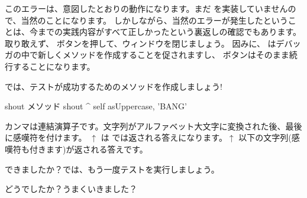\documentclass[a4paper,10pt,twoside]{book}
\begin{document}
このエラーは、意図したとおりの動作になります。まだ  を実装していませんので、当然のことになります。
しかしながら、当然のエラーが発生したということは、今までの実践内容がすべて正しかったという裏返しの確認でもあります。
取り敢えず、 ボタンを押して、ウィンドウを閉じましょう。
因みに、 はデバッガの中で新しくメソッドを作成することを促されますし、 ボタンはそのまま続行することになります。

では、テストが成功するためのメソッドを作成しましょう!

\begin{method}[shout]{shout メソッド}
shout
	^ self asUppercase, 'BANG'
\end{method}

カンマは連結演算子です。文字列がアルファベット大文字に変換された後、最後に感嘆符を付けます。
$\uparrow$ は \pharo では返される答えになります。$\uparrow$ 以下の文字列(感嘆符も付きます)が返される答えです。

できましたか？では、もう一度テストを実行しましょう。

どうでしたか？うまくいきました？
\end{document}
